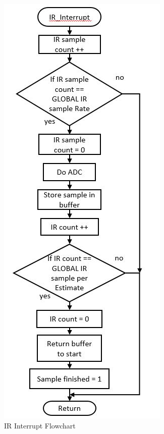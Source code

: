 \documentclass{article}
\begin{document}
\begin{figure}[h]
	\includegraphics[scale=0.8]{IR_interrupt.jpg}
	\centering
	\caption{IR Interrupt Flowchart}
\end{figure}
\end{document}
